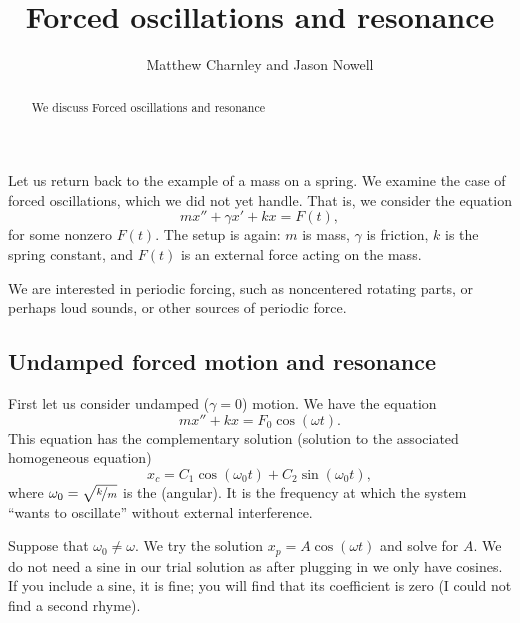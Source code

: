 \documentclass{ximera}
\title{Forced oscillations and resonance}
\author{Matthew Charnley and Jason Nowell}
\begin{document}
\begin{abstract}
    We discuss Forced oscillations and resonance
\end{abstract}
\maketitle

\label{forcedo:section}


\begin{mywrapfigsimp}{2.0in}{2.3in}
    \noindent
    
\end{mywrapfigsimp}
Let us return back to the example of a mass on a spring.  We examine the case of forced oscillations, which we did not yet handle.  That is, we consider the equation
\begin{equation*}
    mx'' + \gamma x' + kx = F(t) ,
\end{equation*}
for some nonzero $F(t)$.  The setup is again: $m$ is mass, $\gamma$ is friction, $k$ is the spring constant, and $F(t)$ is an external force acting on the mass.

We are interested in periodic forcing, such as noncentered rotating parts, or perhaps loud sounds, or other sources of periodic force.  

\subsection{Undamped forced motion and resonance}

First let us consider undamped ($\gamma =0$) motion. We have the equation
\begin{equation*}
    mx'' + kx = F_0 \cos (\omega t) .
\end{equation*}
This equation has the complementary solution (solution to the associated homogeneous equation)
\begin{equation*}
    x_c = C_1 \cos (\omega_0 t) + C_2 \sin (\omega_0 t) ,
\end{equation*}
where $\omega_0 = \sqrt{\nicefrac{k}{m}}$ is the \emph{} (angular).  It is the frequency at which the system ``wants to oscillate'' without external interference.

Suppose that $\omega_0 \not= \omega$.  We try the solution $x_p = A \cos (\omega t)$ and solve for $A$.  We do not need a sine in our trial solution as after plugging in we only have cosines. If you include a sine, it is fine; you will find that its coefficient is zero (I could not find a second rhyme).
\end{document}
